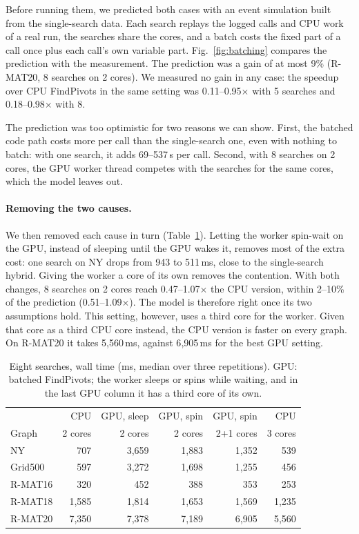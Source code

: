 \documentclass[conference]{IEEEtran}
\begin{document}
Before running them, we predicted both cases with an event simulation built from the single-search data. Each search
replays the logged calls and CPU work of a real run, the searches share the cores, and a batch costs the fixed part of a
call once plus each call's own variable part. Fig.~\ref{fig:batching} compares the prediction with the measurement. The
prediction was a gain of at most 9\% (R-MAT20, 8 searches on 2 cores). We measured no gain in any case: the speedup over
CPU FindPivots in the same setting was 0.11--0.95$\times$ with 5 searches and 0.18--0.98$\times$ with 8.

The prediction was too optimistic for two reasons we can show. First, the batched code path costs more per call than the
single-search one, even with nothing to batch: with one search, it adds 69--537\,\textmu s per call. Second, with 8
searches on 2 cores, the GPU worker thread competes with the searches for the same cores, which the model leaves out.

\paragraph{Removing the two causes.} We then removed each cause in turn (Table~\ref{tab:diag}). Letting the worker
spin-wait on the GPU, instead of sleeping until the GPU wakes it, removes most of the extra cost: one search on NY drops
from 943 to 511\,ms, close to the single-search hybrid. Giving the worker a core of its own removes the contention.
With both changes, 8 searches on 2 cores reach 0.47--1.07$\times$ the CPU version, within 2--10\% of the prediction
(0.51--1.09$\times$). The model is therefore right once its two assumptions hold. This setting, however, uses a third
core for the worker. Given that core as a third CPU core instead, the CPU version is faster on every graph. On R-MAT20 it
takes 5{,}560\,ms, against 6{,}905\,ms for the best GPU setting.

\begin{table}[t]
\centering
\footnotesize\setlength{\tabcolsep}{3pt}
\caption{Eight searches, wall time (ms, median over three repetitions). GPU: batched FindPivots; the worker sleeps or
spins while waiting, and in the last GPU column it has a third core of its own.}
\label{tab:diag}
\begin{tabular}{lrrrrr}
\toprule
 & CPU & GPU, sleep & GPU, spin & GPU, spin & CPU \\
Graph & 2 cores & 2 cores & 2 cores & 2+1 cores & 3 cores \\
\midrule
NY & 707 & 3{,}659 & 1{,}883 & 1{,}352 & 539 \\
Grid500 & 597 & 3{,}272 & 1{,}698 & 1{,}255 & 456 \\
R-MAT16 & 320 & 452 & 388 & 353 & 253 \\
R-MAT18 & 1{,}585 & 1{,}814 & 1{,}653 & 1{,}569 & 1{,}235 \\
R-MAT20 & 7{,}350 & 7{,}378 & 7{,}189 & 6{,}905 & 5{,}560 \\
\bottomrule
\end{tabular}
\end{table}
\end{document}
